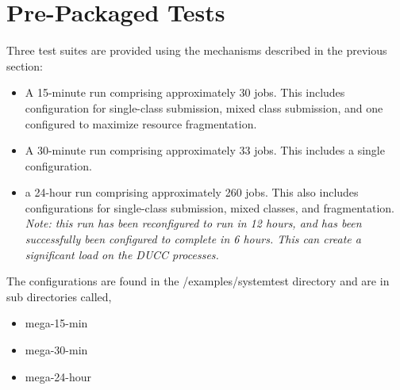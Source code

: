\section{Pre-Packaged Tests}
    Three test suites are provided using the mechanisms described in the previous section:
    \begin{itemize}
      \item A 15-minute run comprising approximately 30 jobs.  This includes configuration for
        single-class submission, mixed class submission, and one configured to maximize
        resource fragmentation.
      \item A 30-minute run comprising approximately 33 jobs. This includes a single
        configuration.
      \item a 24-hour run comprising approximately 260 jobs.  This also includes configurations
        for single-class submission, mixed classes, and fragmentation. {\em Note: this run has
          been reconfigured to run in 12 hours, and has been successfully been configured
          to complete in 6 hours.  This can create a significant load on the DUCC processes.}
    \end{itemize}

     The configurations are found in the \duccruntime/examples/systemtest directory
     and are in sub directories called, 
     \begin{itemize}
       \item mega-15-min
       \item mega-30-min
       \item mega-24-hour
     \end{itemize}
     
